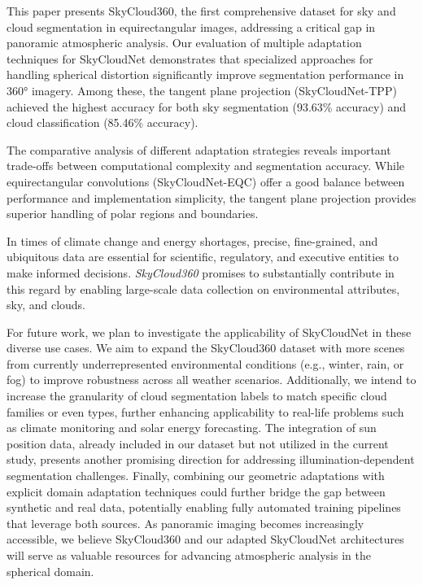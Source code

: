 \documentclass[conference]{IEEEtran}
\begin{document}
This paper presents SkyCloud360, the first comprehensive dataset for sky and cloud segmentation in equirectangular images, addressing a critical gap in panoramic atmospheric analysis. 
Our evaluation of multiple adaptation techniques for SkyCloudNet demonstrates that specialized approaches for handling spherical distortion significantly improve segmentation performance in 360° imagery. 
Among these, the tangent plane projection (SkyCloudNet-TPP) achieved the highest accuracy for both sky segmentation (93.63\% accuracy) and cloud classification (85.46\% accuracy).

The comparative analysis of different adaptation strategies reveals important trade-offs between computational complexity and segmentation accuracy.
While equirectangular convolutions (SkyCloudNet-EQC) offer a good balance between performance and implementation simplicity, the tangent plane projection provides superior handling of polar regions and boundaries.

In times of climate change and energy shortages, precise, fine-grained, and ubiquitous data are essential for scientific, regulatory, and executive entities to make informed decisions.
\textit{SkyCloud360} promises to substantially contribute in this regard by enabling large-scale data collection on environmental attributes, sky, and clouds.

For future work, we plan to investigate the applicability of SkyCloudNet in these diverse use cases. 
We aim to expand the SkyCloud360 dataset with more scenes from currently underrepresented environmental conditions (e.g., winter, rain, or fog) to improve robustness across all weather scenarios. 
Additionally, we intend to increase the granularity of cloud segmentation labels to match specific cloud families or even types, further enhancing applicability to real-life problems such as climate monitoring and solar energy forecasting. 
The integration of sun position data, already included in our dataset but not utilized in the current study, presents another promising direction for addressing illumination-dependent segmentation challenges.
Finally, combining our geometric adaptations with explicit domain adaptation techniques could further bridge the gap between synthetic and real data, potentially enabling fully automated training pipelines that leverage both sources. 
As panoramic imaging becomes increasingly accessible, we believe SkyCloud360 and our adapted SkyCloudNet architectures will serve as valuable resources for advancing atmospheric analysis in the spherical domain.



\end{document}
